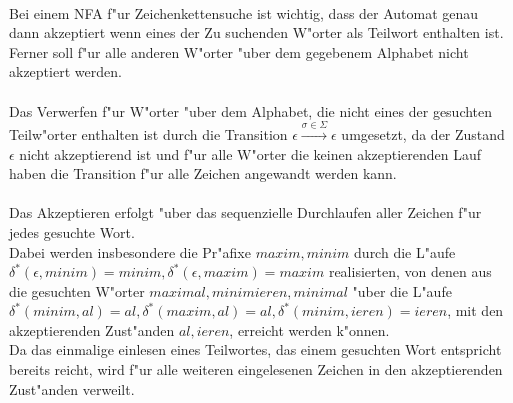 \documentclass{article}
\newcommand{\eps}{\epsilon}
\newcommand{\rao}[1]{\overset{#1}{\rightarrow}}
\begin{document}
\\
Bei einem NFA f"ur Zeichenkettensuche ist wichtig, dass der Automat genau dann
    akzeptiert wenn eines der Zu suchenden W"orter als Teilwort enthalten ist.\\
Ferner soll f"ur alle anderen W"orter "uber dem gegebenem Alphabet nicht 
    akzeptiert werden.\\
\\
Das Verwerfen f"ur W"orter "uber dem Alphabet, die nicht eines der gesuchten
    Teilw"orter enthalten ist durch die Transition 
    $\eps \rao{\sigma \in \Sigma} \eps$ umgesetzt, da der Zustand $\eps$ nicht
    akzeptierend ist und f"ur alle W"orter die keinen akzeptierenden Lauf haben
    die Transition f"ur alle Zeichen angewandt werden kann.\\
\\
Das Akzeptieren erfolgt "uber das sequenzielle Durchlaufen aller Zeichen f"ur
    jedes gesuchte Wort.\\
Dabei werden insbesondere die Pr"afixe $maxim, minim$ durch die L"aufe
    $\delta^*(\eps, minim) = minim, \delta^*(\eps, maxim) = maxim$ realisierten,
    von denen aus die gesuchten W"orter $maximal, minimieren, minimal$ "uber die
    L"aufe 
    $\delta^*(minim, al) = al,
    \delta^*(maxim, al) = al, 
    \delta^*(minim, ieren) = ieren$, mit den akzeptierenden Zust"anden 
    $al, ieren$, erreicht werden k"onnen.\\
Da das einmalige einlesen eines Teilwortes, das einem gesuchten Wort entspricht 
    bereits reicht, wird f"ur alle weiteren eingelesenen Zeichen in den 
    akzeptierenden Zust"anden verweilt.\\
\\

\newpage
\end{document}
